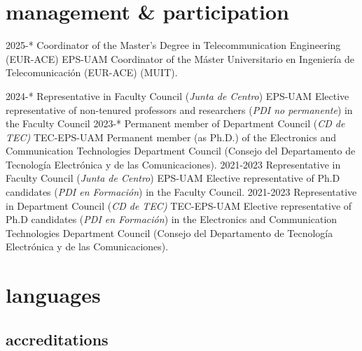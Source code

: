 \documentclass[]{friggeri-cv}
\begin{document}
\section{management \& participation}

\begin{entrylist}
\entry
    {2025-*}
    {Coordinator of the Master's Degree in Telecommunication Engineering (EUR-ACE)}
    {EPS-UAM}
    {Coordinator of the Máster Universitario en Ingeniería de Telecomunicación (EUR-ACE) (MUIT).
    }


\entry
    {2024-*}
    {Representative in Faculty Council (\textit{Junta de Centro})}
    {EPS-UAM}
    {Elective representative of non-tenured professors and researchers (\textit{PDI no permanente}) in the Faculty Council
    }
\entry
    {2023-*}
    {Permanent member of Department Council (\textit{CD de TEC)}}
    {TEC-EPS-UAM}
    {Permanent member (as Ph.D.) of the Electronics and Communication Technologies Department Council (Consejo del Departamento de Tecnología Electrónica y de las Comunicaciones).}
\entry
    {2021-2023}
    {Representative in Faculty Council (\textit{Junta de Centro})}
    {EPS-UAM}
    {Elective representative of Ph.D candidates (\textit{PDI en Formación}) in the Faculty Council.
    }
\entry
    {2021-2023}
    {Representative in Department Council (\textit{CD de TEC)}}
    {TEC-EPS-UAM}
    {Elective representative of Ph.D candidates (\textit{PDI en Formación}) in the Electronics and Communication Technologies Department Council (Consejo del Departamento de Tecnología Electrónica y de las Comunicaciones).}
\end{entrylist}
\vspace{-2em}
\section{languages}
\subsection{accreditations}
\end{document}
